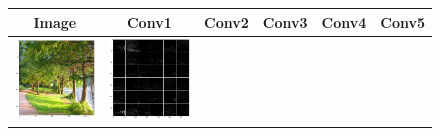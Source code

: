 \begin{figure}[!htb]
\begin{center}
\begin{tabular}{|c|c|c|c|c|c|}
Image & Conv1 & Conv2 & Conv3 & Conv4 & Conv5  \\ \hline
\includegraphics[scale=0.1]{sunny2.png} &
\includegraphics[scale=0.1]{sunny2_conv1_fm.png} &

\end{tabular}
\end{center}
\end{figure}
